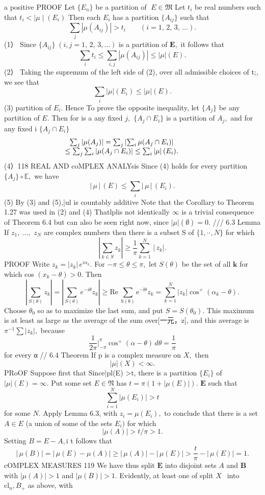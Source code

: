 a positive PROOF Let $\scriptstyle\{E_{n}\}$ be a partition of $\;E\in{\mathfrak{M}}$ Let $t_{i}$ be real numbers such that $t_{i}<\mid\mu\mid(E_{i})$ Then each $E_{i}$ has a partition $\{A_{i j}\}$ such that $$ \sum_{j}|\mu(A_{i j})|>t_{i}\qquad(i=1,\,2,\,3,\,\ldots){\mathrm{.}} $$ (1） Since $\{A_{i j}\}\;(i,j=1,\,2,\,3,\dots)$ is a partition of ${\boldsymbol{E}},$ it follows that $$ \sum_{i}t_{i}\leq\sum_{i,j}|\mu(A_{i j})|\leq|\mu|(E). $$ (2） Taking the supremum of the left side of (2), over all admissible choices of {t;}, we see that $$ \sum_{i}|\mu|(E_{i})\leq|\mu|(E). $$ (3) partition of $E_{i}.$ Hence To prove the opposite inequality, let $\{A_{j}\}$ be any partition of $E.$ Then for is a any fixed $j,$ $\{A_{j}\cap E_{i}\}$ is a partition of $A_{j},$ and for any fixed i $\{A_{j}\cap E_{i}\}$ $$ \begin{array}{c c}{{\sum_{j}\left|\mu(A_{j})\right|=\sum_{j}\left|\sum_{i}\mu(A_{j}\cap E_{i})\right|}}&{{\qquad}}\\ {{\leq\sum_{j}\sum_{i}\left|\mu(A_{j}\cap E_{i})\right|\leq\sum_{i}\left|\mu\right|(E_{i}).}}\end{array} $$ (4）118 REAL AND coMPLEX ANALYsis Since (4) holds for every partition $\{A_{j}\}\circ\mathbb{E},$ we have $$ |\,\mu\,|\,(E)\leq\sum_{i}|\,\mu\,|\,(E_{i}). $$ (5) By (3) and (5),|ul is countably additive Note that the Corollary to Theorem 1.27 was used in (2) and (4) Thatlplis not identically $\infty$ is a trivial consequence of Theorem 6.4 but can also be seen right now, since $|\mu|(\emptyset)=0.$ /// 6.3 Lemma If $z_{1},~\ldots,$ $z_{N}$ are complex numbers then there is a subset S of $\{1,\cdot\cdot,N\}$ for which $$ \left|\sum_{k\in S}z_{k}\right|\geq{\frac{1}{\pi}}\sum_{k=1}^{N}\,\left|\,z_{k}\right|. $$ PROOF Write $z_{k}=|z_{k}|\,e^{i\alpha_{k}}.$ For $-\pi\leq\theta\leq\pi,$ let $S(\theta)$ be the set of all $\boldsymbol{k}$ for which cos $(x_{k}-\theta)>0.$ Then $$ \left|\sum_{S(\theta)}z_{k}\right|=\left|\sum_{S(\theta)}e^{-i\theta}z_{k}\right|\geq\mathrm{Re~\sum_{S(\theta)}e^{-i\theta}}z_{k}=\sum_{k=1}^{N}|z_{k}|\cos^{+}\left(\alpha_{k}-\theta\right). $$ Choose $\theta_{0}$ so as to maximize the last sum, and put $S=S(\theta_{0}).$ This maximum is at least as large as the average of the sum over[一元，z], and this average is $\pi^{-1}\sum|z_{k}|,$ because $$ \frac{1}{2\pi}\left.\right|_{-\pi}^{\pi}\cos^{+}\left(\alpha-\theta\right)\,d\theta=\frac{1}{\pi} $$ for every α // 6.4 Theorem If p is a complex measure on $X,$ then $$ |\mu|(X)<\infty. $$ PRoOF Suppose first that Since|pl(E) >t, there is a partition $\{E_{i}\}$ of $|\mu|(E)=\infty.$ Put some set $E\in{\mathfrak{N}}$ has $t=\pi(1+|\mu(E)|).$ $\boldsymbol{E}$ such that $$ \sum_{i=1}^{N}|\mu(E_{i})|>t $$ for some $N.$ Apply Lemma 6.3, with $z_{i}=\mu(E_{i}),$ to conclude that there is a set $\scriptstyle A\in E$ (a union of some of the sets $E_{i})$ for which $$ |\mu(A)|>t/\pi>1. $$ Setting $B=E-A,{\mathrm{i}}$ t follows that $$ |\,\mu(B)|=|\,\mu(E)-\mu(A)|\geq|\,\mu(A)|-|\,\mu(E)|>\frac{t}{\pi}-|\,\mu(E)|=1. $$cOMPLEX MEASURES 119 We have thus split $\boldsymbol{E}$ into disjoint sets $\scriptstyle A$ and $\boldsymbol{B}$ with $|\mu(A)|>1$ and $\textstyle|\mu(B)|>1.$ Evidently, at least one of split $\textstyle X{\ ~}$ into ${\mathrm{cl}}_{n},B_{+}$ as above, with 